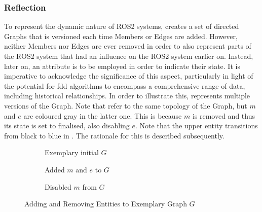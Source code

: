 \subsubsection{Reflection}
    To represent the dynamic nature of ROS2 systems,  creates a set of directed Graphs that is versioned each time Members or Edges are added.
    However, neither Members nor Edges are ever removed in order to also represent parts of the ROS2 system that had an influence on the ROS2 system earlier on. Instead, later on, an attribute is to be employed in order to indicate their state.\newline
    It is imperative to acknowledge the significance of this aspect, particularly in light of the potential for \acl{fdd} algorithms to encompass a comprehensive range of data, including historical relationships. In order to illustrate this,  represents multiple versions of the Graph. Note that  refer to the same topology of the Graph, but $m$ and $e$ are coloured gray in the latter one. This is because $m$ is removed and thus its state is set to \glqq{}finalised\grqq{}, also disabling $e$. Note that the upper entity transitions from black to blue in . The rationale for this is described subsequently.
    \begin{figure}[h]
        \centering
        \begin{subfigure}[h]{.3\textwidth}
            \centering
            
            \caption{Exemplary initial $G$ \legend} \label{fig:tikz:mathModel:initialGraph}
        \end{subfigure}
        \begin{subfigure}[h]{.3\textwidth}
            \centering
            
            \caption{Added $m$ and $e$ to $G$ \legend} \label{fig:tikz:mathModel:addedMember}
        \end{subfigure}
        \begin{subfigure}[h]{.3\textwidth}
            \centering
            
            \caption{Disabled $m$ from $G$ \legendadapted} \label{fig:tikz:mathModel:removedMember}
        \end{subfigure}
        \caption[Adding and Disabling Entities from Exemplary Graph]{Adding and Removing Entities to Exemplary Graph $G$} \label{fig:tikz:mathModel:versioning}
    \end{figure}
\FloatBarrier

